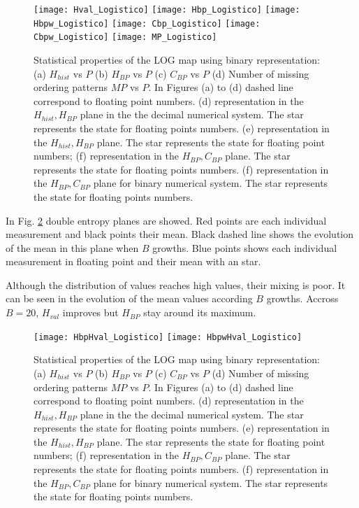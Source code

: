 \begin{figure}
	\texttt{[image: Hval\_Logistico]}
	\texttt{[image: Hbp\_Logistico]}
	\texttt{[image: Hbpw\_Logistico]}
	\texttt{[image: Cbp\_Logistico]}
	\texttt{[image: Cbpw\_Logistico]}
	\texttt{[image: MP\_Logistico]}
	\caption{Statistical properties of the LOG map using binary representation: (a) $H_{hist}$ vs $P$ (b) $H_{BP}$ vs $P$ (c) $C_{BP}$ vs $P$ (d) Number of missing ordering patterns $MP$ vs $P$. In Figures (a) to (d) dashed line correspond to floating point numbers. (d) representation in the $H_{hist},H_{BP}$ plane in the the decimal numerical system.  The star represents the state for floating points numbers. (e) representation in the $H_{hist},H_{BP}$ plane. The star represents the state for floating point numbers; (f) representation in the $H_{BP},C_{BP}$ plane.  The star represents the state for floating points numbers. (f) representation in the $H_{BP},C_{BP}$ plane for binary numerical system.  The star represents the state for floating points numbers. } \label{fig:LOG_QuantiB}
\end{figure}

In Fig. \ref{fig:LOG_HH} double entropy planes are showed.
Red points are each individual measurement and black points their mean.
Black dashed line shows the evolution of the mean in this plane when $B$ growths.
Blue points shows each individual measurement in floating point and their mean with an star.

Although the distribution of values reaches high values, their mixing is poor.
It can be seen in the evolution of the mean values according $B$ growths.
Accross $B=20$, $H_{val}$ improves but $H_{BP}$ stay around its maximum.

\begin{figure}
	\texttt{[image: HbpHval\_Logistico]}
	\texttt{[image: HbpwHval\_Logistico]}
	\caption{Statistical properties of the LOG map using binary representation: (a) $H_{hist}$ vs $P$ (b) $H_{BP}$ vs $P$ (c) $C_{BP}$ vs $P$ (d) Number of missing ordering patterns $MP$ vs $P$. In Figures (a) to (d) dashed line correspond to floating point numbers. (d) representation in the $H_{hist},H_{BP}$ plane in the the decimal numerical system.  The star represents the state for floating points numbers. (e) representation in the $H_{hist},H_{BP}$ plane. The star represents the state for floating point numbers; (f) representation in the $H_{BP},C_{BP}$ plane.  The star represents the state for floating points numbers. (f) representation in the $H_{BP},C_{BP}$ plane for binary numerical system.  The star represents the state for floating points numbers. } \label{fig:LOG_HH}
\end{figure}

